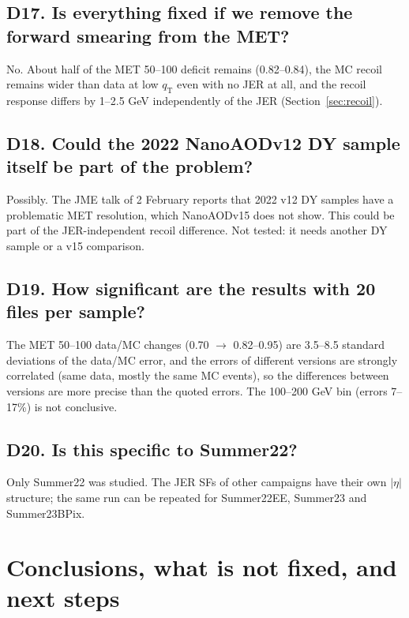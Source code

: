 \documentclass[11pt,a4paper]{article}
\newcommand{\aeta}{$|\eta|$}
\begin{document}
\subsection*{D17. Is everything fixed if we remove the forward smearing from the MET?}
No. About half of the MET 50--100 deficit remains (0.82--0.84), the MC recoil remains wider than data at low $q_\mathrm{T}$ even with no
JER at all, and the recoil response differs by 1--2.5 GeV independently of the JER (Section~\ref{sec:recoil}).

\subsection*{D18. Could the 2022 NanoAODv12 DY sample itself be part of the problem?}
Possibly. The JME talk of 2 February reports that 2022 v12 DY samples have a problematic MET resolution, which NanoAODv15 does not show.
This could be part of the JER-independent recoil difference. Not tested: it needs another DY sample or a v15 comparison.

\subsection*{D19. How significant are the results with 20 files per sample?}
The MET 50--100 data/MC changes (0.70 $\to$ 0.82--0.95) are 3.5--8.5 standard deviations of the data/MC error, and the errors of different
versions are strongly correlated (same data, mostly the same MC events), so the differences between versions are more precise than
the quoted errors. The 100--200 GeV bin (errors 7--17\%) is not conclusive.

\subsection*{D20. Is this specific to Summer22?}
Only Summer22 was studied. The JER SFs of other campaigns have their own \aeta{} structure; the same run can be repeated for
Summer22EE, Summer23 and Summer23BPix.

\section{Conclusions, what is not fixed, and next steps}
\label{sec:concl}
\end{document}
